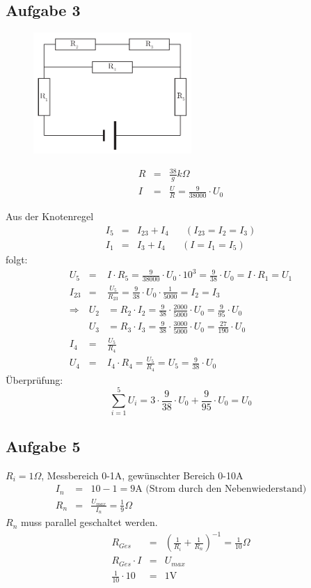 \documentclass[12pt,a4paper]{article}
\begin{document}
\subsection*{Aufgabe 3}
\begin{figure}
\centering
\includegraphics[width=6cm]{exercise3.pdf}
\end{figure}
\begin{eqnarray*}
R & = & \frac{38}{g} k\Omega \\
I & = & \frac{U}{R} = \frac{9}{38000} \cdot U_0
\end{eqnarray*}

Aus der Knotenregel
\begin{eqnarray*}
I_5 & = & I_{23} + I_4 \hspace{20pt} ( I_{23} = I_2 = I_3 ) \\
I_1 & = & I_3 + I_4 \hspace{20pt} ( I = I_1 = I_5 )
\end{eqnarray*}
folgt:
\begin{eqnarray*}
U_5 & = & I \cdot R_5 = \frac{9}{38000} \cdot U_0 \cdot 10^3 = \frac{9}{38} \cdot U_0 = I \cdot R_1 = U_1 \\
I_{23} & = & \frac{U_5}{R_{23}} = \frac{9}{38} \cdot U_0 \cdot \frac{1}{5000} = I_2 = I_3 \\
\Rightarrow & U_2 & = R_2 \cdot I_2 = \frac{9}{38} \cdot \frac{2000}{5000} \cdot U_0 = \frac{9}{95} \cdot U_0 \\
& U_3 & = R_3 \cdot I_3 = \frac{9}{38} \cdot \frac{3000}{5000} \cdot U_0 = \frac{27}{190} \cdot U_0 \\
I_4 & = & \frac{U_5}{R_4} \\
U_4 & = & I_4 \cdot R_4 = \frac{U_5}{R_4} = U_5 = \frac{9}{38} \cdot U_0
\end{eqnarray*}
\"Uberpr\"ufung:
\[ \sum_{i=1}^5 U_i = 3 \cdot \frac{9}{38} \cdot U_0 + \frac{9}{95} \cdot U_0 = U_0 \]

\subsection*{Aufgabe 5}
$R_i = 1\Omega$, Messbereich 0-1A, gew\"unschter Bereich 0-10A
\begin{eqnarray*}
I_n & = & 10 - 1 = 9\mbox{A (Strom durch den Nebenwiederstand)} \\
R_n & = & \frac{U_{max}}{I_n} = \frac{1}{9}  \Omega
\end{eqnarray*}
$R_n$ muss parallel geschaltet werden.
\begin{eqnarray*}
R_{Ges} & = & \left( \frac{1}{R_i} + \frac{1}{R_n} \right) ^{-1} = \frac{1}{10}\Omega \\
R_{Ges} \cdot I & = & U_{max} \\
\frac{1}{10} \cdot 10 & = & 1 \mbox{V}
\end{eqnarray*}
\end{document}
